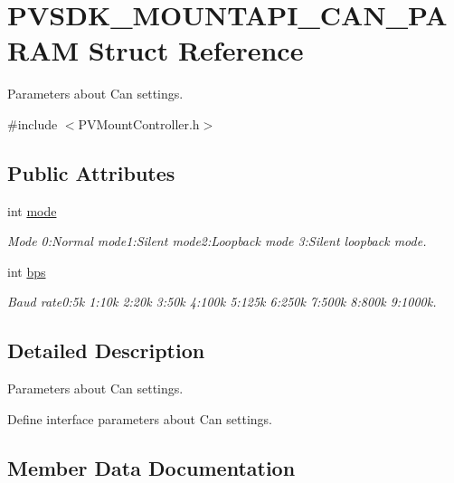 \hypertarget{struct_p_v_s_d_k___m_o_u_n_t_a_p_i___c_a_n___p_a_r_a_m}{}\section{P\+V\+S\+D\+K\+\_\+\+M\+O\+U\+N\+T\+A\+P\+I\+\_\+\+C\+A\+N\+\_\+\+P\+A\+R\+AM Struct Reference}
\label{struct_p_v_s_d_k___m_o_u_n_t_a_p_i___c_a_n___p_a_r_a_m}


Parameters about Can settings.  




{\ttfamily \#include $<$P\+V\+Mount\+Controller.\+h$>$}

\subsection*{Public Attributes}
\begin{DoxyCompactItemize}
\item 
int \hyperlink{struct_p_v_s_d_k___m_o_u_n_t_a_p_i___c_a_n___p_a_r_a_m_a92c34f96b9fbe047605a64879c3f8c23}{mode}
\begin{DoxyCompactList}\small\item\em Mode 0\+:Normal mode1\+:Silent mode2\+:Loopback mode 3\+:Silent loopback mode. \end{DoxyCompactList}\item 
int \hyperlink{struct_p_v_s_d_k___m_o_u_n_t_a_p_i___c_a_n___p_a_r_a_m_ad5837447961182e1ba0b32f1b67ffbcc}{bps}
\begin{DoxyCompactList}\small\item\em Baud rate0\+:5k 1\+:10k 2\+:20k 3\+:50k 4\+:100k 5\+:125k 6\+:250k 7\+:500k 8\+:800k 9\+:1000k. \end{DoxyCompactList}\end{DoxyCompactItemize}


\subsection{Detailed Description}
Parameters about Can settings. 

Define interface parameters about Can settings. 

\subsection{Member Data Documentation}
\mbox{\label{struct_p_v_s_d_k___m_o_u_n_t_a_p_i___c_a_n___p_a_r_a_m_ad5837447961182e1ba0b32f1b67ffbcc}} 
